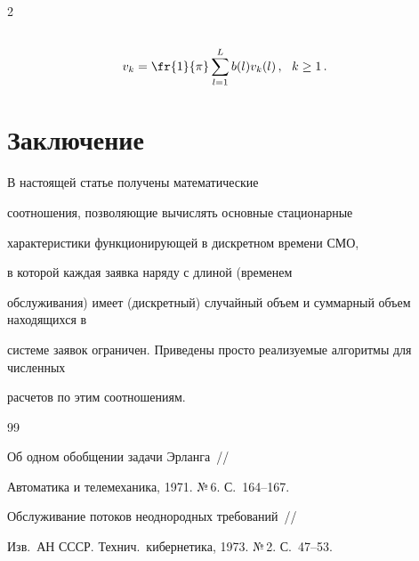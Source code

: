 \begin{multicols}{2}
\begin{align*}
\\


v_k &= \fr{1}{\pi} \sum\limits_{l=1}^{L} b(l) v_k(l) \,,\ \ k\ge 1\,.


\end{align*}





\section{Заключение}





В настоящей статье получены математические


соотношения, позволяющие вычислять основные стационарные


характеристики функционирующей в дискретном времени СМО,


в которой каждая заявка наряду с длиной (временем


обслуживания) имеет (дискретный) случайный объем и суммарный объем находящихся в


системе заявок ограничен. Приведены просто реализуемые алгоритмы для численных


расчетов по этим соотношениям.





{\small\frenchspacing


{%




\begin{thebibliography}{99}












Об одном обобщении задачи Эрланга~//


Автоматика и телемеханика, 1971. №\,6. С.~164--167.











Обслуживание потоков неоднородных требований~//


Изв.\ АН СССР. Технич.\ кибернетика, 1973. №\,2. С.~47--53.






\end{thebibliography}}}
\end{multicols}
